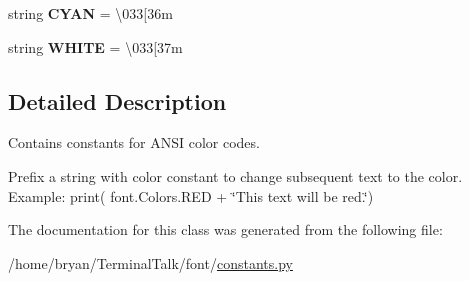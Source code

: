 \begin{DoxyCompactItemize}
\item 
string {\bfseries C\+Y\+AN} = \textquotesingle{}\textbackslash{}033\mbox{[}36m\textquotesingle{}\hypertarget{classfont_1_1constants_1_1Colors_a3d199ec328ec474f2aa6919aed63c9be}{}\label{classfont_1_1constants_1_1Colors_a3d199ec328ec474f2aa6919aed63c9be}

\item 
string {\bfseries W\+H\+I\+TE} = \textquotesingle{}\textbackslash{}033\mbox{[}37m\textquotesingle{}\hypertarget{classfont_1_1constants_1_1Colors_a10f7fbd2ec87e066fe3fba002e2191b6}{}\label{classfont_1_1constants_1_1Colors_a10f7fbd2ec87e066fe3fba002e2191b6}

\end{DoxyCompactItemize}


\subsection{Detailed Description}
Contains constants for A\+N\+SI color codes. 

Prefix a string with color constant to change subsequent text to the color. Example\+: print( font.\+Colors.\+R\+ED + \char`\"{}\+This text will be red.\char`\"{}) 

The documentation for this class was generated from the following file\+:\begin{DoxyCompactItemize}
\item 
/home/bryan/\+Terminal\+Talk/font/\hyperlink{constants_8py}{constants.\+py}\end{DoxyCompactItemize}
